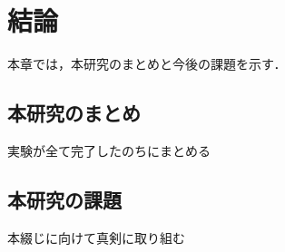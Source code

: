 \chapter{結論}
\label{conclusion}

本章では，本研究のまとめと今後の課題を示す．

\section{本研究のまとめ}

実験が全て完了したのちにまとめる

\section{本研究の課題}

本綴じに向けて真剣に取り組む

